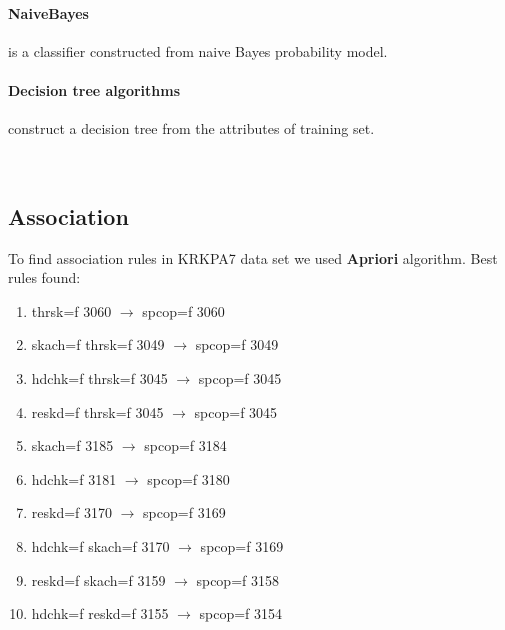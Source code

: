 \documentclass[11pt]{article}
\begin{document}
\paragraph{NaiveBayes} is a classifier constructed from naive Bayes probability model.
\paragraph{Decision tree algorithms} construct a decision tree from the attributes of training set.

\mbox{}\\
\begin{table}[h]
\caption{WEKA Classifiers}
\label{tab:attributes}
\end{table}

\subsection{Association}
To find association rules in KRKPA7 data set we used {\bf Apriori} algorithm.
Best rules found:

\begin{enumerate}
\item thrsk=f 3060 $\rightarrow$ spcop=f 3060
\item skach=f thrsk=f 3049 $\rightarrow$ spcop=f 3049
\item hdchk=f thrsk=f 3045 $\rightarrow$ spcop=f 3045
\item reskd=f thrsk=f 3045 $\rightarrow$ spcop=f 3045
\item skach=f 3185 $\rightarrow$ spcop=f 3184
\item hdchk=f 3181 $\rightarrow$ spcop=f 3180
\item reskd=f 3170 $\rightarrow$ spcop=f 3169
\item hdchk=f skach=f 3170 $\rightarrow$ spcop=f 3169
\item reskd=f skach=f 3159 $\rightarrow$ spcop=f 3158
\item hdchk=f reskd=f 3155 $\rightarrow$ spcop=f 3154
\end{enumerate}
\end{document}
